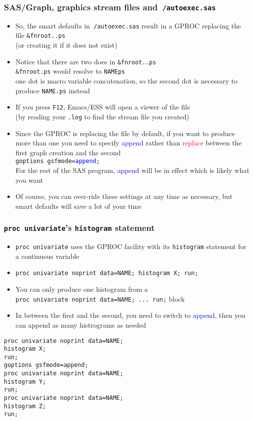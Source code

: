 \documentclass[11pt,pdftex,dvipsnames,usenames,helvetica]{beamer}
\begin{document}
\begin{frame}[fragile]
  \frametitle{SAS/Graph, graphics stream files
and {\tt $~$/autoexec.sas}}
\begin{itemize}
\item So, the smart defaults in {\tt $~$/autoexec.sas}
result in a GPROC replacing the file {\tt \&fnroot..ps}\\
(or creating it if it does not exist)
\item Notice that there are two does in {\tt \&fnroot..ps}\\
{\tt \&fnroot.ps} would resolve to {\tt NAMEps}\\
one dot is macro variable concatenation, so the second dot is necessary
to produce {\tt NAME.ps} instead
\item If you press {\tt F12}, Emacs/ESS will open a viewer of
the file\\ (by reading your {\tt .log} to find the stream file you created)
\item Since the GPROC is replacing the file by default, if you want to
  produce more than one you need to specify \textcolor{blue}{append}
  rather than
  \textcolor{red}{replace} between the first graph creation and the second\\
  {\tt goptions gsfmode=\textcolor{blue}{append};}\\
For the rest of the SAS program, \textcolor{blue}{append} will 
be in effect which is likely what you want
\item Of course, you can over-ride these settings at any time
as necessary, but smart defaults will save a lot of your time 
\end{itemize}

\end{frame}

\begin{frame}[fragile]
  \frametitle{{\tt proc univariate}'s {\tt histogram} statement}
\begin{itemize}
\item {\tt proc univariate} uses the GPROC facility with its 
{\tt histogram} statement for a continuous variable
\item {\tt proc univariate noprint data=NAME; histogram X; run;}
\item You can only produce one histogram from a \\
{\tt proc univariate noprint data=NAME; ...\ run;} block
\item In between the first and the second, you need to 
switch to \textcolor{blue}{append}, then you can append as many 
histrograms as needed
\end{itemize}
\begin{verbatim}
proc univariate noprint data=NAME; 
histogram X;
run;
goptions gsfmode=append;
proc univariate noprint data=NAME; 
histogram Y;
run;
proc univariate noprint data=NAME; 
histogram Z;
run;
\end{verbatim}
\end{frame}
\end{document}
